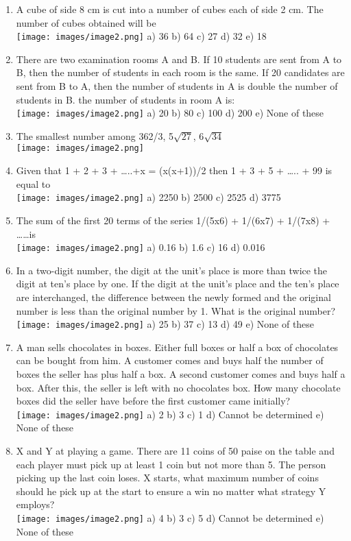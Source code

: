 \documentclass[
]{article}
\begin{document}
\begin{enumerate}
\item A cube of side 8 cm is cut into a number of cubes each of side 2 cm. The number of cubes obtained will be  \\
\texttt{[image: images/image2.png]} a) 36 	b) 64 	c) 27 	d) 32 	e) 18
\item There are two examination rooms A and B. If 10 students are sent from A to B, then the number of students in each room is the same. If 20 candidates are sent from B to A, then the number of students in A is double the number of students in B. the number of students in room A is: \\
\texttt{[image: images/image2.png]} a) 20 	b) 80 	c) 100 	d) 200 	e) None of these
\item The smallest number among 362/3, 5$ \sqrt{27} $, 6$ \sqrt{34} $ \\
\texttt{[image: images/image2.png]} 
\item Given that 1 + 2 + 3 + …..+x = (x(x+1))/2 then 1 + 3 + 5 + ….. + 99 is equal to \\
\texttt{[image: images/image2.png]} a) 2250 	b) 2500 	c) 2525 	d) 3775
\item The sum of the first 20 terms of the series 1/(5x6) + 1/(6x7) + 1/(7x8) + ……is \\
\texttt{[image: images/image2.png]} a) 0.16 	b) 1.6 	c) 16 	d) 0.016
\item In a two-digit number, the digit at the unit’s place is more than twice the digit at ten’s place by one. If the digit at the unit’s place and the ten’s place are interchanged, the difference between the newly formed and the original number is less than the original number by 1. What is the original number?  \\
\texttt{[image: images/image2.png]} a) 25 	b) 37 	c) 13 	d) 49 	e) None of these
\item A man sells chocolates in boxes. Either full boxes or half a box of chocolates can be bought from him. A customer comes and buys half the number of boxes the seller has plus half a box. A second customer comes and buys half a box. After this, the seller is left with no chocolates box. How many chocolate boxes did the seller have before the first customer came initially? \\
\texttt{[image: images/image2.png]} a) 2 	b) 3 	c) 1 	d) Cannot be determined 	e) None of these
\item X and Y at playing a game. There are 11 coins of 50 paise on the table and each player must pick up at least 1 coin but not more than 5. The person picking up the last coin loses. X starts, what maximum number of coins should he pick up at the start to ensure a win no matter what strategy Y employs? \\
\texttt{[image: images/image2.png]} a) 4 	b) 3 	c) 5 	d) Cannot be determined 	e) None of these

\end{enumerate}
\end{document}
